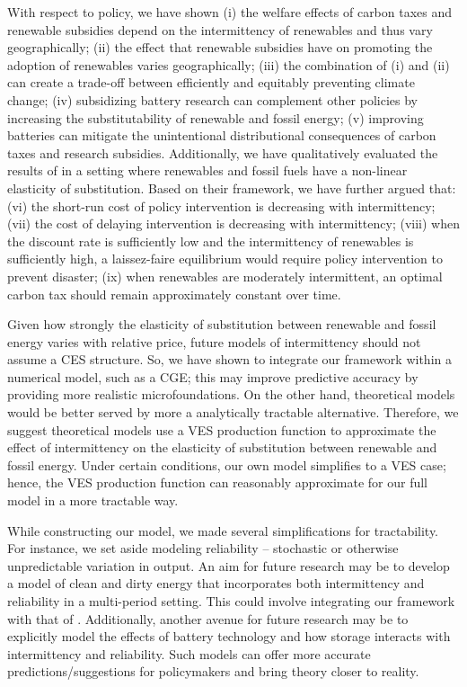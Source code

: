 \documentclass[11pt,a4paper]{extarticle}
\begin{document}
With respect to policy, we have shown (i) the welfare effects of carbon taxes and renewable subsidies depend on the intermittency of renewables and thus vary geographically; (ii) the effect that renewable subsidies have on promoting the adoption of renewables varies geographically; (iii) the combination of (i) and (ii) can create a trade-off between efficiently and equitably preventing climate change; (iv) subsidizing battery research can complement other policies by increasing the substitutability of renewable and fossil energy; (v) improving batteries can mitigate the unintentional distributional consequences of carbon taxes and research subsidies.  Additionally, we have qualitatively evaluated the results of \citet{Ace2012} in a setting where renewables and fossil fuels have a non-linear elasticity of substitution. Based on their framework, we have further argued that: (vi) the short-run cost of policy intervention is decreasing with intermittency;  (vii) the cost of delaying intervention is decreasing with intermittency; (viii) when the discount rate is sufficiently low and the intermittency of renewables is sufficiently high, a laissez-faire equilibrium would require policy intervention to prevent disaster; (ix) when renewables are moderately intermittent, an optimal carbon tax should remain approximately constant over time. 

Given how strongly the elasticity of substitution between renewable and fossil energy varies with relative price, future models of intermittency should not assume a CES structure. So, we have shown to integrate our framework within a numerical model, such as a CGE; this may improve predictive accuracy by providing more realistic microfoundations. On the other hand, theoretical models would be better served by more a analytically tractable alternative. Therefore, we suggest theoretical models use a VES production function to approximate the effect of intermittency on the elasticity of substitution between renewable and fossil energy. Under certain conditions, our own model simplifies to a VES case; hence, the VES production function can reasonably approximate for our full model in a more tractable way. 

While constructing our model, we made several simplifications for tractability. For instance, we set aside modeling reliability -- stochastic or otherwise unpredictable variation in output. An aim for future research may be to develop a model of clean and dirty energy that incorporates both intermittency and reliability in a multi-period setting. This could involve integrating our framework with that of \citet{HH}. Additionally, another avenue for future research may be to explicitly model the effects of battery technology and how storage interacts with intermittency and reliability. Such models can offer more accurate predictions/suggestions for policymakers and bring theory closer to reality.
\end{document}
